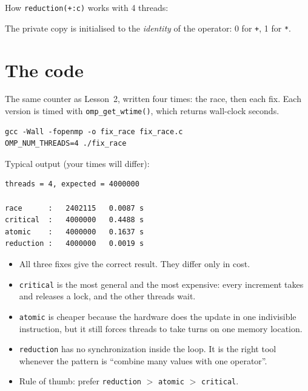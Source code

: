 \documentclass[11pt,a4paper]{article}
\begin{document}
\noindent How \texttt{reduction(+:c)} works with 4 threads:
\begin{center}
\end{center}
The private copy is initialised to the \emph{identity} of the operator: 0 for \texttt{+},
1 for \texttt{*}.

\section{The code}
The same counter as Lesson~2, written four times: the race, then each fix. Each version
is timed with \texttt{omp\_get\_wtime()}, which returns wall-clock seconds.



\begin{lstlisting}[style=sh]
gcc -Wall -fopenmp -o fix_race fix_race.c
OMP_NUM_THREADS=4 ./fix_race
\end{lstlisting}
Typical output (your times will differ):
\begin{lstlisting}[style=sh]
threads = 4, expected = 4000000

race      :   2402115   0.0087 s
critical  :   4000000   0.4488 s
atomic    :   4000000   0.1637 s
reduction :   4000000   0.0019 s
\end{lstlisting}

\begin{keyidea}
\begin{itemize}
  \item All three fixes give the correct result. They differ only in cost.
  \item \texttt{critical} is the most general and the most expensive: every increment
        takes and releases a lock, and the other threads wait.
  \item \texttt{atomic} is cheaper because the hardware does the update in one
        indivisible instruction, but it still forces threads to take turns on one
        memory location.
  \item \texttt{reduction} has no synchronization inside the loop. It is the right tool
        whenever the pattern is ``combine many values with one operator''.
  \item Rule of thumb: prefer \texttt{reduction} $>$ \texttt{atomic} $>$ \texttt{critical}.
\end{itemize}
\end{keyidea}
\end{document}
